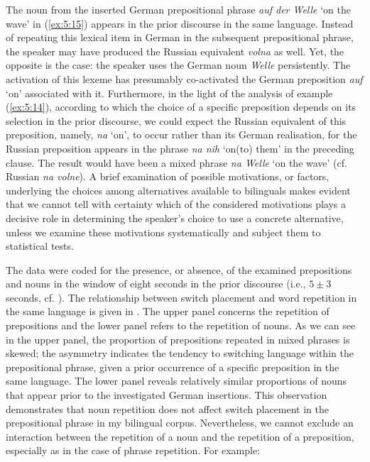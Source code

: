\noindent The noun from the inserted German prepositional phrase \textit{auf der Welle} `on the wave' in (\ref{ex:5:15}) appears in the prior discourse in the same language. Instead of repeating this lexical item in German in the subsequent prepositional phrase, the speaker may have produced the Russian equivalent \textit{volna} as well. Yet, the opposite is the case: the speaker uses the German noun \textit{Welle} persistently. The activation of this lexeme has presumably co-activated the German preposition \textit{auf} `on' associated with it. Furthermore, in the light of the analysis of example (\ref{ex:5:14}), according to which the choice of a specific preposition depends on its selection in the prior discourse, we could expect the Russian equivalent of this preposition, namely, \textit{na} `on', to occur rather than its German realisation, for the Russian preposition appears in the phrase \textit{na nih} `on(to) them' in the preceding clause. The result would have been a mixed phrase \textit{na Welle} `on the wave' (cf. Russian \textit{na volne}). A brief examination of possible motivations, or factors, underlying the choices among alternatives available to bilinguals makes evident that we cannot tell with certainty which of the considered motivations plays a decisive role in determining the speaker's choice to use a concrete alternative, unless we examine these motivations systematically and subject them to statistical tests.

The data were coded for the presence, or absence, of the examined prepositions and nouns in the window of eight seconds in the prior discourse (i.e., \(5 \pm 3\) seconds, cf. \citealt[189]{szmrecsanyi2006}). The relationship between switch placement and word repetition in the same language is given in . The upper panel concerns the repetition of prepositions and the lower panel refers to the repetition of nouns. As we can see in the upper panel, the proportion of prepositions repeated in mixed phrases is skewed; the asymmetry indicates the tendency to switching language within the prepositional phrase, given a prior occurrence of a specific preposition in the same language. The lower panel reveals relatively similar proportions of nouns that appear prior to the investigated German insertions. This observation demonstrates that noun repetition does not affect switch placement in the prepositional phrase in my bilingual corpus. Nevertheless, we cannot exclude an interaction between the repetition of a noun and the repetition of a preposition, especially as in the case of phrase repetition. For example:

